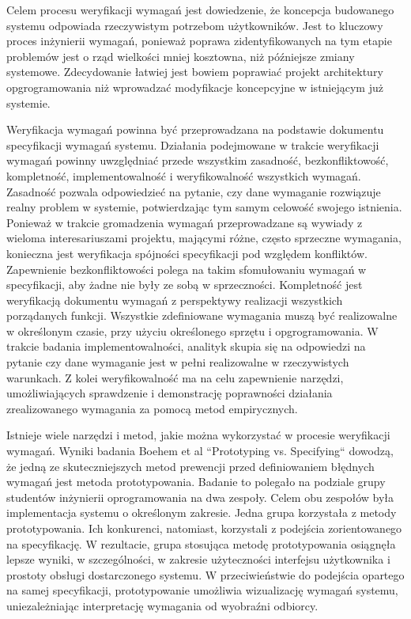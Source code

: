        Celem procesu weryfikacji wymagań jest dowiedzenie, że koncepcja budowanego systemu odpowiada rzeczywistym potrzebom użytkowników. Jest to kluczowy proces inżynierii wymagań, ponieważ poprawa zidentyfikowanych na tym etapie problemów jest o rząd wielkości mniej kosztowna, niż późniejsze zmiany systemowe. Zdecydowanie łatwiej jest bowiem poprawiać projekt architektury opgrogramowania niż wprowadzać modyfikacje koncepcyjne w istniejącym już systemie. 

        Weryfikacja wymagań powinna być przeprowadzana na podstawie dokumentu specyfikacji wymagań systemu. Działania podejmowane w trakcie weryfikacji wymagań powinny uwzględniać przede wszystkim zasadność, bezkonfliktowość, kompletność, implementowalność i weryfikowalność wszystkich wymagań. Zasadność pozwala odpowiedzieć na pytanie, czy dane wymaganie rozwiązuje realny problem w systemie, potwierdzając tym samym celowość swojego istnienia. Ponieważ w trakcie gromadzenia wymagań przeprowadzane są wywiady z wieloma interesariuszami projektu, mającymi różne, często sprzeczne wymagania, konieczna jest weryfikacja spójności specyfikacji pod względem konfliktów. Zapewnienie bezkonfliktowości polega na takim sfomułowaniu wymagań w specyfikacji, aby żadne nie były ze sobą w sprzeczności. Kompletność jest weryfikacją dokumentu wymagań z perspektywy realizacji wszystkich porządanych funkcji. Wszystkie zdefiniowane wymagania muszą być realizowalne w określonym czasie, przy użyciu określonego sprzętu i opgrogramowania. W trakcie badania implementowalności, analityk skupia się na odpowiedzi na pytanie czy dane wymaganie jest w pełni realizowalne w rzeczywistych warunkach. Z kolei weryfikowalność ma na celu zapewnienie narzędzi, umożliwiających sprawdzenie i demonstrację poprawności działania zrealizowanego wymagania za pomocą metod empirycznych.

        Istnieje wiele narzędzi i metod, jakie można wykorzystać w procesie weryfikacji wymagań. Wyniki badania Boehem et al ``Prototyping vs. Specifying`` \cite{Boehm84} dowodzą, że jedną ze skuteczniejszych metod prewencji przed definiowaniem błędnych wymagań jest metoda prototypowania. Badanie to polegało na podziale grupy studentów inżynierii oprogramowania na dwa zespoły. Celem obu zespołów była implementacja systemu o określonym zakresie. Jedna grupa korzystała z metody prototypowania. Ich konkurenci, natomiast, korzystali z podejścia zorientowanego na specyfikację. W rezultacie, grupa stosująca metodę prototypowania osiągnęła lepsze wyniki, w szczególności, w zakresie użyteczności interfejsu użytkownika i prostoty obsługi dostarczonego systemu. W przeciwieństwie do podejścia opartego na samej specyfikacji, prototypowanie umożliwia wizualizację wymagań systemu, uniezależniając interpretację wymagania od wyobraźni odbiorcy. 

